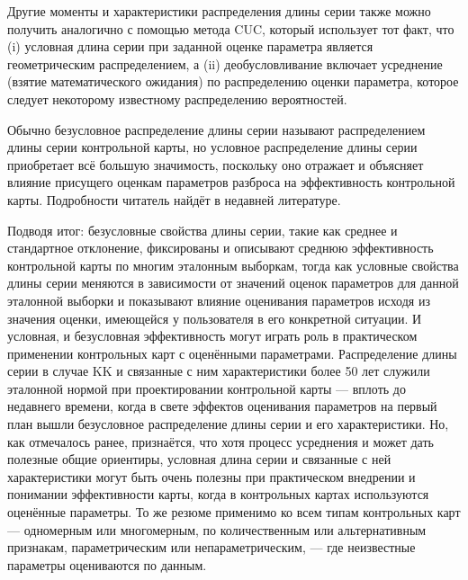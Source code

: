 Другие моменты и характеристики распределения длины серии также можно получить аналогично с помощью метода CUC, который использует тот факт, что (i) условная длина серии при заданной оценке параметра является геометрическим распределением, а (ii) деобусловливание включает усреднение (взятие математического ожидания) по распределению оценки параметра, которое следует некоторому известному распределению вероятностей.

Обычно безусловное распределение длины серии называют распределением длины серии контрольной карты, но условное распределение длины серии приобретает всё большую значимость, поскольку оно отражает и объясняет влияние присущего оценкам параметров разброса на эффективность контрольной карты. Подробности читатель найдёт в недавней литературе.

Подводя итог: безусловные свойства длины серии, такие как среднее и стандартное отклонение, фиксированы и описывают среднюю эффективность контрольной карты по многим эталонным выборкам, тогда как условные свойства длины серии меняются в зависимости от значений оценок параметров для данной эталонной выборки и показывают влияние оценивания параметров исходя из значения оценки, имеющейся у пользователя в его конкретной ситуации. И условная, и безусловная эффективность могут играть роль в практическом применении контрольных карт с оценёнными параметрами. Распределение длины серии в случае KK и связанные с ним характеристики более 50 лет служили эталонной нормой при проектировании контрольной карты — вплоть до недавнего времени, когда в свете эффектов оценивания параметров на первый план вышли безусловное распределение длины серии и его характеристики. Но, как отмечалось ранее, признаётся, что хотя процесс усреднения и может дать полезные общие ориентиры, условная длина серии и связанные с ней характеристики могут быть очень полезны при практическом внедрении и понимании эффективности карты, когда в контрольных картах используются оценённые параметры. То же резюме применимо ко всем типам контрольных карт — одномерным или многомерным, по количественным или альтернативным признакам, параметрическим или непараметрическим, — где неизвестные параметры оцениваются по данным.

